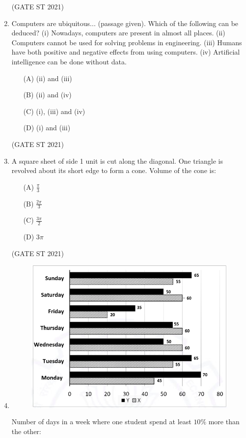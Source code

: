 \documentclass[journal,12pt,onecolumn]{IEEEtran}
\theoremstyle{remark}
\begin{document}
\begin{enumerate}
\hfill (GATE ST 2021)\\
\item
Computers are ubiquitous... (passage given).  
Which of the following can be deduced?  
(i) Nowadays, computers are present in almost all places.  
(ii) Computers cannot be used for solving problems in engineering.  
(iii) Humans have both positive and negative effects from using computers.  
(iv) Artificial intelligence can be done without data.

\begin{enumerate}
\item[(A)] (ii) and (iii)
\item[(B)] (ii) and (iv)
\item[(C)] (i), (iii) and (iv)
\item[(D)] (i) and (iii)
\end{enumerate}

\hfill (GATE ST 2021)\\

\item
A square sheet of side 1 unit is cut along the diagonal.  
One triangle is revolved about its short edge to form a cone.  
Volume of the cone is:

\begin{enumerate}
\item[(A)] $\frac{\pi}{3}$
\item[(B)] $\frac{2\pi}{3}$
\item[(C)] $\frac{3\pi}{2}$
\item[(D)] $3\pi$
\end{enumerate}
\hfill (GATE ST 2021)\\

\newpage
\item
\begin{figure}
    \centering
    \includegraphics[width=0.5\linewidth]{figs/4.png}
    \caption{}
    \label{fig:2}
\end{figure}

  
Number of days in a week where one student spend at least $10\%$ more than the other:


\end{enumerate}
\end{document}
